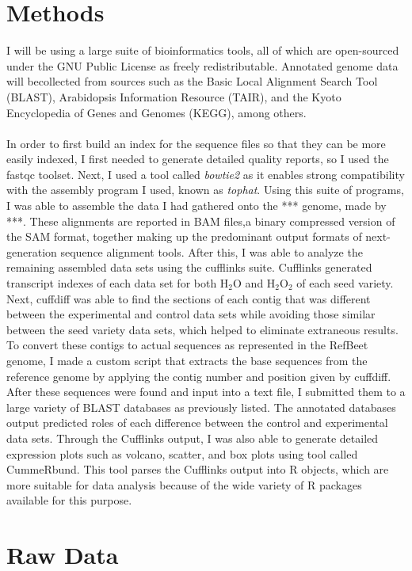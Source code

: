 \documentclass{article}
\begin{document}
\section{Methods}
	I will be using a large suite of bioinformatics tools, all of which are open-sourced under the GNU Public License as freely redistributable. Annotated genome data will becollected from sources such as the Basic Local Alignment Search Tool (BLAST), Arabidopsis Information Resource (TAIR), and the Kyoto Encyclopedia of Genes and Genomes (KEGG), among others.\\\\
	In order to first build an index for the sequence files so that they can be more easily indexed, I first needed to generate detailed quality reports, so I used the fastqc toolset. Next, I used a tool called \emph{bowtie2} as it enables strong compatibility with the assembly program I used, known as \emph{tophat}. Using this suite of programs, I was able to assemble the data I had gathered onto the *** genome, made by ***. These alignments are reported in BAM  files,a binary compressed version of the SAM format, together making up the predominant output formats of next-generation sequence alignment tools. After this, I was able to analyze the remaining assembled data sets using the cufflinks suite. Cufflinks generated transcript indexes of each data set for both H$_{2}$O and H$_{2}$O$_{2}$ of each seed variety. Next, cuffdiff was able to find the sections of each contig that was different between the experimental and control data sets while avoiding those similar between the seed variety data sets, which helped to eliminate extraneous results. To convert these contigs to actual sequences as represented in the RefBeet genome, I made a custom script that extracts the base sequences from the reference genome by applying the contig number and position given by cuffdiff. After these sequences were found and input into a text file, I submitted them to a large variety of BLAST databases as previously listed. The annotated databases output predicted roles of each difference between the control and experimental data sets. Through the Cufflinks output, I was also able to generate detailed expression plots such as volcano, scatter, and box plots using tool called CummeRbund. This tool parses the Cufflinks output into R objects, which are more suitable for data analysis because of the wide variety of R packages available for this purpose.

\section{Raw Data}
\end{document}
